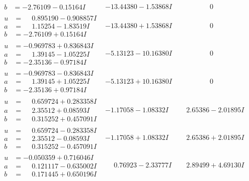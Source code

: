 \documentclass[1p]{elsarticle_modified}
\theoremstyle{definition}
\begin{document}
$$\begin{array}{c|c|c}
\begin{aligned}
b &= -2.76109 - 0.15164 I\end{aligned}
 & -13.44380 - 1.53868 I & \phantom{-0.000000 } 0 \\ \hline\begin{aligned}
u &= \phantom{-}0.895190 - 0.908857 I \\
a &= \phantom{-}1.15254 - 1.83519 I \\
b &= -2.76109 + 0.15164 I\end{aligned}
 & -13.44380 + 1.53868 I & \phantom{-0.000000 } 0 \\ \hline\begin{aligned}
u &= -0.969783 + 0.836843 I \\
a &= \phantom{-}1.39145 - 1.05225 I \\
b &= -2.35136 - 0.97184 I\end{aligned}
 & -5.13123 - 10.16380 I & \phantom{-0.000000 } 0 \\ \hline\begin{aligned}
u &= -0.969783 - 0.836843 I \\
a &= \phantom{-}1.39145 + 1.05225 I \\
b &= -2.35136 + 0.97184 I\end{aligned}
 & -5.13123 + 10.16380 I & \phantom{-0.000000 } 0 \\ \hline\begin{aligned}
u &= \phantom{-}0.659724 + 0.283358 I \\
a &= \phantom{-}2.35512 + 0.08593 I \\
b &= \phantom{-}0.315252 + 0.457091 I\end{aligned}
 & -1.17058 - 1.08332 I & \phantom{-}2.65386 - 2.01895 I \\ \hline\begin{aligned}
u &= \phantom{-}0.659724 - 0.283358 I \\
a &= \phantom{-}2.35512 - 0.08593 I \\
b &= \phantom{-}0.315252 - 0.457091 I\end{aligned}
 & -1.17058 + 1.08332 I & \phantom{-}2.65386 + 2.01895 I \\ \hline\begin{aligned}
u &= -0.050359 + 0.716046 I \\
a &= \phantom{-}0.121117 - 0.635002 I \\
b &= \phantom{-}0.171445 + 0.650196 I\end{aligned}
 & \phantom{-}0.76923 - 2.33777 I & \phantom{-}2.89499 + 4.69130 I \\ \hline\begin{aligned}

\end{aligned}
\end{array}$$
\end{document}

